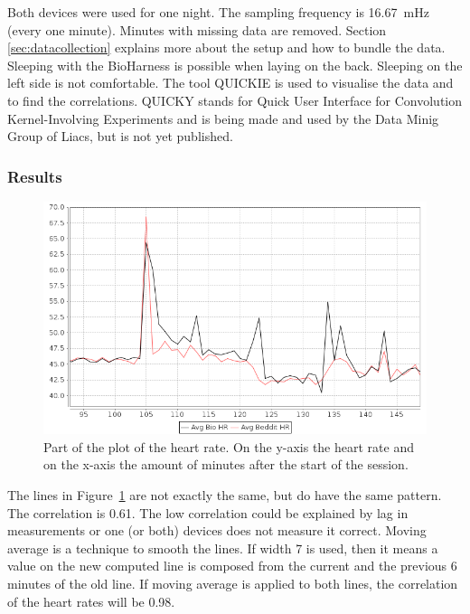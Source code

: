 			Both devices were used for one night. The sampling frequency is \SI{16.67}{\milli\hertz} (every one minute). Minutes with missing data are removed. Section \ref{sec:datacollection} explains more about the setup and how to bundle the data. Sleeping with the BioHarness is possible when laying on the back. Sleeping on the left side is not comfortable. The tool QUICKIE is used to visualise the data and to find the correlations. QUICKY stands for Quick User Interface for Convolution Kernel-Involving Experiments and is being made and used by the Data Minig Group of Liacs, but is not yet published.

		\subsubsection{Results}
			
			\begin{figure}[h]
				\centering
					\includegraphics[scale=0.5]{avgbiovsavgbeddit.png}
					\caption{Part of the plot of the heart rate. On the y-axis the heart rate and on the x-axis the amount of minutes after the start of the session.}
				\label{fig:avgbiovsavgbeddit}

			\end{figure}

			The lines in Figure~\ref{fig:avgbiovsavgbeddit} are not exactly the same, but do have the same pattern. The correlation is 0.61. The low correlation could be explained by lag in measurements or one (or both) devices does not measure it correct. Moving average is a technique to smooth the lines. If width 7 is used, then it means a value on the new computed line is composed from the current and the previous 6 minutes of the old line. If moving average is applied to both lines, the correlation of the heart rates will be 0.98.\
						
